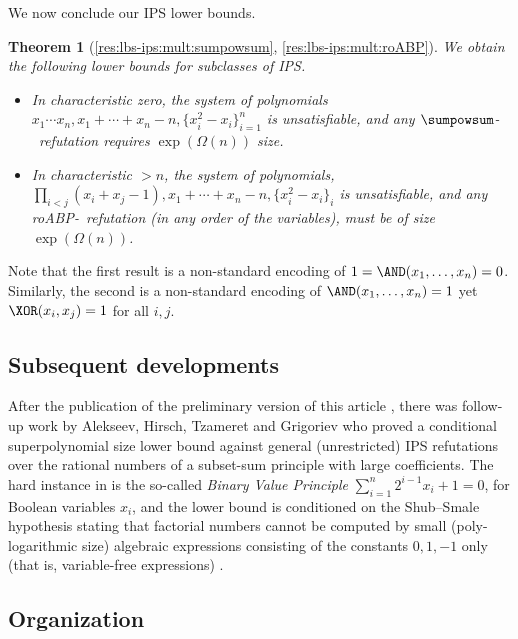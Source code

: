 \documentclass[11pt]{article}
\numberwithin{equation}{section}
\newtheorem{theorem}{Theorem}[section]
\theoremstyle{definition}
\theoremstyle{plain}
\begin{document}
We now conclude our IPS lower bounds.

\begin{theorem}[\autoref{res:lbs-ips:mult:sumpowsum}, \autoref{res:lbs-ips:mult:roABP}]
        We obtain the following lower bounds for subclasses of IPS.

        \begin{itemize}
                \item In characteristic zero, the system of polynomials $x_1\cdots x_n,x_1+\cdots+x_n-n,\{x_i^2-x_i\}_{i=1}^n$ is unsatisfiable, and any $\sumpowsum$-\IPS\ refutation requires
$\exp(\Omega(n))$ size.

                \item In characteristic $>n$, the system of polynomials, $\prod_{i<j}(x_i+x_j-1),x_1+\cdots+x_n-n,\{x_i^2-x_i\}_i$ is unsatisfiable, and any roABP-\IPS\ refutation (in any order of the variables),
must be of size $\exp(\Omega(n))$.
                        \qedhere
        \end{itemize}
\end{theorem}

Note that the first result is a non-standard encoding of $1=\AND(x_1,\ldots,x_n)=0$. Similarly, the second is a non-standard encoding of $\AND(x_1,\ldots,x_n)=1$ yet $\XOR(x_i,x_j)=1$ for all $i,j$.


\subsection{Subsequent developments}
After the %
publication  %
of the preliminary version of this article \cite{FSTW16},
there was %
%
follow-up work by Alekseev, Hirsch, Tzameret and Grigoriev \cite{AGHT19} who proved a conditional superpolynomial size lower bound against general (unrestricted)  IPS refutations over the rational numbers of a %
%
subset-sum  %
principle with large coefficients. The hard instance in \cite{AGHT19} is the so-called \emph{Binary Value Principle} $\sum_{i=1}^n 2^{i-1}x_i+1=0$, for Boolean %
variables $x_i$,  %
and the lower bound is conditioned on the Shub--Smale hypothesis stating that  factorial numbers cannot be computed by small (poly-logarithmic size)  algebraic expressions consisting of the constants $0,1,-1$ only (that is, variable-free expressions) \cite{SS95}. %
%
%


\subsection{Organization}
\end{document}
